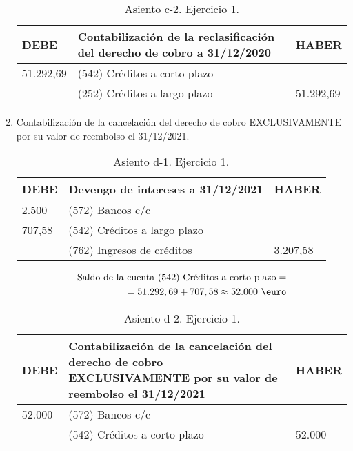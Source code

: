 \begin{enumerate}[label=\alph*)]
    \begin{table}[H]
        \centering
        \begin{tabular}{|p{3cm}|p{6cm}|p{3cm}|}
        \hline
        \rowcolor{blue!30}
        \textbf{DEBE} & \textbf{Contabilización de la reclasificación del derecho de cobro a 31/12/2020} & \textbf{HABER} \\
        \hline
        51.292,69 & (542) Créditos a corto plazo & \\
        \hline
        & (252) Créditos a largo plazo & 51.292,69 \\
        \hline
        \end{tabular}
        \caption{Asiento c-2. Ejercicio 1.}
        \label{tabla:asiento4ej1T2}
    \end{table}

    \item Contabilización de la cancelación del derecho de cobro EXCLUSIVAMENTE por su valor de reembolso el 31/12/2021.
    
    \begin{table}[H]
        \centering
        \begin{tabular}{|p{3cm}|p{6cm}|p{3cm}|}
        \hline
        \rowcolor{blue!30}
        \textbf{DEBE} & \textbf{Devengo de intereses a 31/12/2021} & \textbf{HABER} \\
        \hline
        2.500 & (572) Bancos c/c & \\
        \hline
        707,58 & (542) Créditos a largo plazo & \\
        \hline
        & (762) Ingresos de créditos & 3.207,58 \\
        \hline
        \end{tabular}
        \caption{Asiento d-1. Ejercicio 1.}
        \label{tabla:asiento5ej1T2}
    \end{table}
    \begin{align*}
        \text{Saldo de la cuenta (542) Créditos a corto plazo} = \\ = 51.292,69 + 707,58 \approx \text{52.000} \text{ \euro}
    \end{align*}

    \begin{table}[H]
        \centering
        \begin{tabular}{|p{3cm}|p{6cm}|p{3cm}|}
        \hline
        \rowcolor{blue!30}
        \textbf{DEBE} & \textbf{Contabilización de la cancelación del derecho de cobro EXCLUSIVAMENTE por su valor de reembolso el 31/12/2021} & \textbf{HABER} \\
        \hline
        52.000 & (572) Bancos c/c & \\
        \hline
        & (542) Créditos a corto plazo & 52.000 \\
        \hline
        \end{tabular}
        \caption{Asiento d-2. Ejercicio 1.}
        \label{tabla:asiento6ej1T2}
    \end{table}
\end{enumerate}

